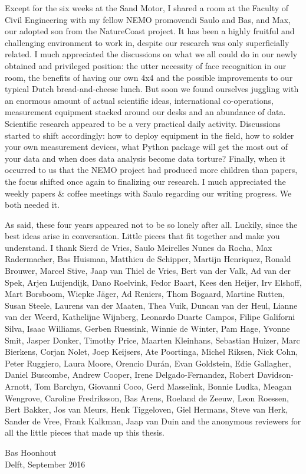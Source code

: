 Except for the six weeks at the Sand Motor, I shared a room at the
Faculty of Civil Engineering with my fellow NEMO promovendi Saulo and
Bas, and Max, our adopted son from the NatureCoast project. It has
been a highly fruitful and challenging environment to work in, despite
our research was only superficially related. I much appreciated the
discussions on what we all could do in our newly obtained and
privileged position: the utter necessity of face recognition in our
room, the benefits of having our own 4x4 and the possible improvements
to our typical Dutch bread-and-cheese lunch. But soon we found
ourselves juggling with an enormous amount of actual scientific ideas,
international co-operations, measurement equipment stacked around our
desks and an abundance of data. Scientific research appeared to be a
very practical daily activity. Discussions started to shift
accordingly: how to deploy equipment in the field, how to solder your
own measurement devices, what Python package will get the most out of
your data and when does data analysis become data torture? Finally,
when it occurred to us that the NEMO project had produced more
children than papers, the focus shifted once again to finalizing our
research. I much appreciated the weekly papers \& coffee meetings with
Saulo regarding our writing progress. We both needed it.

As said, these four years appeared not to be so lonely after
all. Luckily, since the best ideas arise in conversation. Little
pieces that fit together and make you understand. I thank
Sierd de Vries,
Saulo Meirelles Nunes da Rocha,
Max Radermacher,
Bas Huisman,
Matthieu de Schipper,
Martijn Henriquez,
Ronald Brouwer,
Marcel Stive,
Jaap van Thiel de Vries,
Bert van der Valk,
Ad van der Spek,
Arjen Luijendijk,
Dano Roelvink,
Fedor Baart,
Kees den Heijer,
Irv Elshoff,
Mart Borsboom,
Wiepke J{\"a}ger,
Ad Reniers,
Thom Bogaard,
Martine Rutten,
Susan Steele,
Laurens van der Maaten,
Thea Vuik,
Duncan van der Heul,
Lianne van der Weerd,
Kathelijne Wijnberg,
Leonardo Duarte Campos,
Filipe Galiforni Silva,
Isaac Williams,
Gerben Ruessink,
Winnie de Winter,
Pam Hage,
Yvonne Smit,
Jasper Donker,
Timothy Price,
Maarten Kleinhans,
Sebastian Huizer,
Marc Bierkens,
Corjan Nolet,
Joep Keijsers,
Ate Poortinga,
Michel Riksen,
Nick Cohn,
Peter Ruggiero,
Laura Moore,
Orencio Dur{\'a}n,
Evan Goldstein,
Edie Gallagher,
Daniel Buscombe,
Andrew Cooper,
Irene Delgado-Fernandez,
Robert Davidson-Arnott,
Tom Barchyn,
Giovanni Coco,
Gerd Masselink,
Bonnie Ludka,
Meagan Wengrove,
Caroline Fredriksson,
Bas Arens,
Roeland de Zeeuw,
Leon Roessen,
Bert Bakker,
Jos van Meurs,
Henk Tiggeloven,
Giel Hermans,
Steve van Herk,
Sander de Vree,
Frank Kalkman,
Jaap van Duin
and the anonymous reviewers
for all the little pieces that made up this thesis.

\bigskip

\begin{flushright}
  Bas Hoonhout \\
  Delft, September 2016
\end{flushright}


